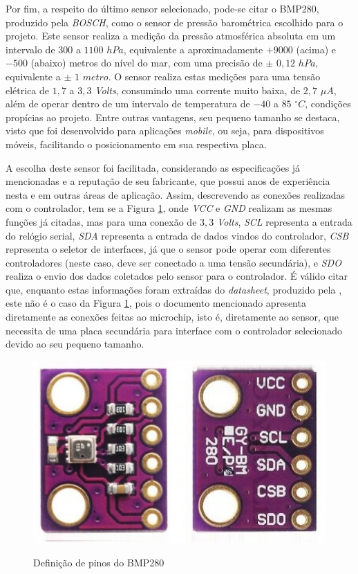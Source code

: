 \documentclass[acronym,symbols,table]{fei}
\begin{document}
Por fim, a respeito do último sensor selecionado, pode-se citar o BMP280, produzido pela \textit{BOSCH}, como o sensor de pressão barométrica escolhido para o projeto. Este sensor realiza a medição da pressão atmosférica absoluta em um intervalo de $300$ a $1100$ $hPa$, equivalente a aproximadamente $+9000$ (acima) e $-500$ (abaixo) metros do nível do mar, com uma precisão de $\pm$ $0,12$ $hPa$, equivalente a $\pm$ $1$ $metro$. O sensor realiza estas medições para uma tensão elétrica de $1,7$ a $3,3$ \textit{Volts}, consumindo uma corrente muito baixa, de $2,7$ $\mu$$A$, além de operar dentro de um intervalo de temperatura de $-40$ a $85$ $^{\circ}C$, condições propícias ao projeto. Entre outras vantagens, seu pequeno tamanho se destaca, visto que foi desenvolvido para aplicações \textit{mobile}, ou seja, para dispositivos móveis, facilitando o posicionamento em sua respectiva placa.

A escolha deste sensor foi facilitada, considerando as especificações já mencionadas e a reputação de seu fabricante, que possui anos de experiência nesta e em outras áreas de aplicação. Assim, descrevendo as conexões realizadas com o controlador, tem se a Figura \ref{fig:PinPress}, onde \textit{VCC} e \textit{GND} realizam as mesmas funções já citadas, mas para uma conexão de $3,3$ \textit{Volts}, \textit{SCL} representa a entrada do relógio serial, \textit{SDA} representa a entrada de dados vindos do controlador, \textit{CSB} representa o seletor de interfaces, já que o sensor pode operar com diferentes controladores (neste caso, deve ser conectado a uma tensão secundária), e \textit{SDO} realiza o envio dos dados coletados pelo sensor para o controlador. É válido citar que, enquanto estas informações foram extraídas do \textit{datasheet}, produzido pela \textcite{BMP280}, este não é o caso da Figura \ref{fig:PinPress}, pois o documento mencionado apresenta diretamente as conexões feitas ao microchip, isto é, diretamente ao sensor, que necessita de uma placa secundária para interface com o controlador selecionado devido ao seu pequeno tamanho.

\begin{figure}[!htb]
\centering
    \caption{Definição de pinos do BMP280}
    \includegraphics[width=0.25\linewidth]{Imagens/PinPress.png}
    \label{fig:PinPress}
\end{figure}
\end{document}
